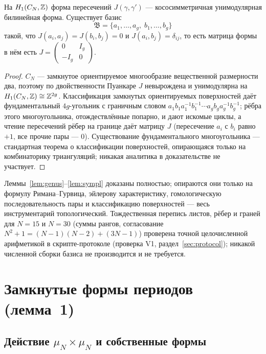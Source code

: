 \begin{lemma}\label{lem:sympl}
На $H_1(C_N,\mathbb{Z})$ форма пересечений $J(\gamma,\gamma')$ ---
кососимметричная унимодулярная билинейная форма. Существует базис
\[
  \mathfrak{B}=\{a_1,\dots,a_g,\; b_1,\dots,b_g\}
\]
такой, что $J(a_i,a_j)=J(b_i,b_j)=0$ и $J(a_i,b_j)=\delta_{ij}$, то
есть матрица формы в нём есть
$J=\begin{pmatrix}0&I_g\\-I_g&0\end{pmatrix}$.
\end{lemma}

\begin{proof}
$C_N$ --- замкнутое ориентируемое многообразие вещественной размерности
два, поэтому по двойственности Пуанкаре $J$ невырождена и
унимодулярна на $H_1(C_N,\mathbb{Z})\cong\mathbb{Z}^{2g}$. Классификация замкнутых
ориентируемых поверхностей даёт фундаментальный $4g$-угольник с
граничным словом
$a_1b_1a_1^{-1}b_1^{-1}\cdots a_gb_ga_g^{-1}b_g^{-1}$; рёбра этого
многоугольника, отождествлённые попарно, и дают искомые циклы, а
чтение пересечений рёбер на границе даёт матрицу $J$ (пересечение
$a_i$ с $b_i$ равно $+1$, все прочие пары --- $0$). Существование
фундаментального многоугольника --- стандартная теорема о
классификации поверхностей, опирающаяся только на комбинаторику
триангуляций; никакая аналитика в доказательстве не участвует.
\end{proof}

\begin{statusbox}
Леммы~\ref{lem:genus}--\ref{lem:sympl} доказаны полностью; опираются
они только на формулу Римана--Гурвица, эйлерову характеристику,
гомологическую последовательность пары и классификацию поверхностей ---
весь инструментарий топологический. Тождественная перепись листов,
рёбер и граней для $N=15$ и $N=30$ (суммы рангов, согласование
$N^2+1=(N-1)(N-2)+(3N-1)$) проверена точной целочисленной арифметикой
в скрипте-протоколе (проверка V1, раздел~\ref{sec:protocol}); никакой
численной сборки базиса не производится и не требуется.
\end{statusbox}

\section{Замкнутые формы периодов (лемма~1)}\label{sec:periods}

\subsection{Действие $\mu_N\times\mu_N$ и собственные формы}

